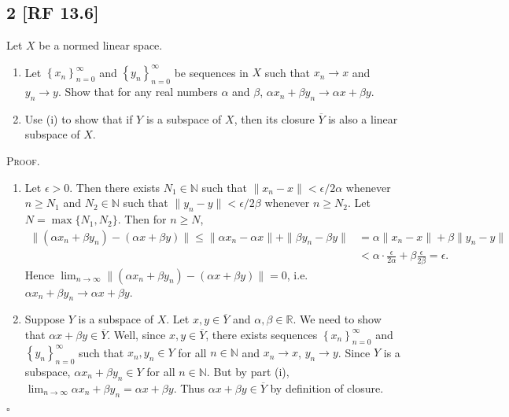 \documentclass[12pt]{article}
\newcounter{ProofCounter}
\newenvironment{Proof}{\stepcounter{ProofCounter}\textsc{Proof.}}{\hfill$\square$}
\begin{document}
\subsection*{2 [RF 13.6]}
\begin{tcolorbox}
  Let $X$ be a normed linear space.
  \begin{enumerate}[label = (\roman*)]
    \item Let $\left\{ x_n \right\}_{n=0}^{\infty}$ and $\left\{ y_{n} \right\}_{n=0}^{\infty}$ be sequences in $X$ such that $x_n \rightarrow x$ and
      $y_n \rightarrow y$. Show that for any real numbers $\alpha$ and $\beta$, $\alpha x_n + \beta y_n \rightarrow \alpha x + \beta y$.
    \item Use (i) to show that if $Y$ is a subspace of $X$, then its closure $\overline{Y}$ is also a linear subspace of $X$.
  \end{enumerate}
\end{tcolorbox}
\begin{Proof}
  \begin{enumerate}[label = (\roman*)]
    \item Let $\epsilon > 0$. Then there exists $N_{1} \in \mathbb{N}$ such that $\| x_n - x\| < \epsilon / 2\alpha$ whenever $n \geq N_1$ and $N_2 \in \mathbb{N}$ 
      such that $\|y_n - y\| < \epsilon / 2\beta$ whenever $n \geq N_2$. Let $N = \max\{N_1, N_2\}$. Then for $n \geq N$,
      \begin{align*}
        \|(\alpha x_n + \beta y_n) - (\alpha x + \beta y)\| \leq \|\alpha x_n - \alpha x\| + \|\beta y_n - \beta y\| & = \alpha \|x_n - x\| + \beta
        \|y_n - y\| \\
        & < \alpha \cdot \frac{\epsilon}{2\alpha} + \beta \frac{\epsilon}{2\beta} = \epsilon.
      \end{align*}
      Hence $\lim_{n\rightarrow\infty}\|(\alpha x_n + \beta y_n) - (\alpha x + \beta y)\| = 0$, i.e. $\alpha x_n + \beta y_n \rightarrow \alpha x +
      \beta y$.
    \item Suppose $Y$ is a subspace of $X$. Let $x,y \in \overline{Y}$ and $\alpha, \beta \in \mathbb{R}$. We need to show that $\alpha x + \beta y
      \in \overline{Y}$. Well, since $x,y \in \overline{Y}$, there exists sequences $\left\{ x_n \right\}_{n=0}^{\infty}$ and $\left\{ y_n
      \right\}_{n=0}^{\infty}$ such that $x_n,y_n \in Y$ for all $n \in \mathbb{N}$ and $x_n \rightarrow x$, $y_n \rightarrow y$. 
      Since $Y$ is a subspace, $\alpha x_n + \beta y_n \in Y$ for all $n
      \in \mathbb{N}$. But by part (i), $\lim_{n\rightarrow \infty}\alpha x_n + \beta y_n = \alpha x + \beta y$. Thus $\alpha x + \beta y \in
      \overline{Y}$ by definition of closure.
  \end{enumerate}
\end{Proof}
\end{document}
